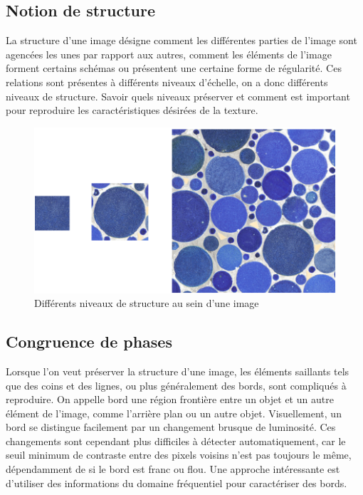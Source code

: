 \subsection*{Notion de structure}

La structure d'une image désigne comment les différentes parties de l'image sont agencées les unes par rapport aux autres, comment les éléments de l'image forment certains schémas ou présentent une certaine forme de régularité. Ces relations sont présentes à différents niveaux d'échelle, on a donc différents niveaux de structure. Savoir quels niveaux préserver et comment est important pour reproduire les caractéristiques désirées de la texture.

\begin{figure}[h!]
    \centering
    \includegraphics[width=.85\linewidth]{contenu/resources/images/structure_level}
    \caption{Différents niveaux de structure au sein d'une image}
    \label{fig:structure_level}
\end{figure}

\subsection*{Congruence de phases}

Lorsque l'on veut préserver la structure d'une image, les éléments saillants tels que des coins et des lignes, ou plus généralement des bords, sont compliqués à reproduire. On appelle \og bord \fg une région frontière entre un objet et un autre élément de l'image, comme l'arrière plan ou un autre objet. Visuellement, un bord se distingue facilement par un changement brusque de luminosité. Ces changements sont cependant plus difficiles à détecter automatiquement, car le seuil minimum de contraste entre des pixels voisins n'est pas toujours le même, dépendamment de si le bord est franc ou flou. Une approche intéressante est d'utiliser des informations du domaine fréquentiel pour caractériser des bords.

